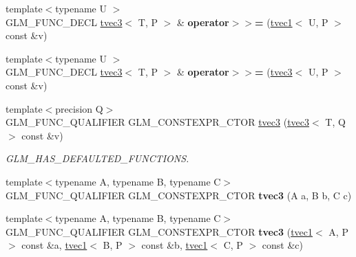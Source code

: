 \begin{DoxyCompactItemize}
{\footnotesize template$<$typename U $>$ }\\G\+L\+M\+\_\+\+F\+U\+N\+C\+\_\+\+D\+E\+CL \hyperlink{structglm_1_1tvec3}{tvec3}$<$ T, P $>$ \& {\bfseries operator$>$$>$=} (\hyperlink{structglm_1_1tvec1}{tvec1}$<$ U, P $>$ const \&v)
\item 
\mbox{\label{structglm_1_1tvec3_a42bc834efe85364cd4ec1f3398c433be}} 
{\footnotesize template$<$typename U $>$ }\\G\+L\+M\+\_\+\+F\+U\+N\+C\+\_\+\+D\+E\+CL \hyperlink{structglm_1_1tvec3}{tvec3}$<$ T, P $>$ \& {\bfseries operator$>$$>$=} (\hyperlink{structglm_1_1tvec3}{tvec3}$<$ U, P $>$ const \&v)
\item 
\mbox{\label{structglm_1_1tvec3_a60887256e89b9a7bb72e352171804e74}} 
{\footnotesize template$<$precision Q$>$ }\\G\+L\+M\+\_\+\+F\+U\+N\+C\+\_\+\+Q\+U\+A\+L\+I\+F\+I\+ER G\+L\+M\+\_\+\+C\+O\+N\+S\+T\+E\+X\+P\+R\+\_\+\+C\+T\+OR \hyperlink{structglm_1_1tvec3_a60887256e89b9a7bb72e352171804e74}{tvec3} (\hyperlink{structglm_1_1tvec3}{tvec3}$<$ T, Q $>$ const \&v)
\begin{DoxyCompactList}\small\item\em G\+L\+M\+\_\+\+H\+A\+S\+\_\+\+D\+E\+F\+A\+U\+L\+T\+E\+D\+\_\+\+F\+U\+N\+C\+T\+I\+O\+NS. \end{DoxyCompactList}\item 
\mbox{\label{structglm_1_1tvec3_ae469956ac3e43086bb2f12c874448b32}} 
{\footnotesize template$<$typename A, typename B, typename C$>$ }\\G\+L\+M\+\_\+\+F\+U\+N\+C\+\_\+\+Q\+U\+A\+L\+I\+F\+I\+ER G\+L\+M\+\_\+\+C\+O\+N\+S\+T\+E\+X\+P\+R\+\_\+\+C\+T\+OR {\bfseries tvec3} (A a, B b, C c)
\item 
\mbox{\label{structglm_1_1tvec3_ac1b6201d66ed9b7ff28606cc73d020da}} 
{\footnotesize template$<$typename A, typename B, typename C$>$ }\\G\+L\+M\+\_\+\+F\+U\+N\+C\+\_\+\+Q\+U\+A\+L\+I\+F\+I\+ER G\+L\+M\+\_\+\+C\+O\+N\+S\+T\+E\+X\+P\+R\+\_\+\+C\+T\+OR {\bfseries tvec3} (\hyperlink{structglm_1_1tvec1}{tvec1}$<$ A, P $>$ const \&a, \hyperlink{structglm_1_1tvec1}{tvec1}$<$ B, P $>$ const \&b, \hyperlink{structglm_1_1tvec1}{tvec1}$<$ C, P $>$ const \&c)
\item 
\mbox{\label{structglm_1_1tvec3_ae81af9e0d61ef8ed21994b9f824c4235}} 

\end{DoxyCompactItemize}
